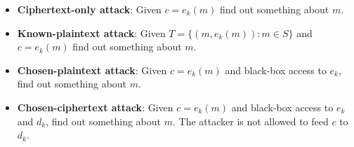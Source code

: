 \begin{itemize}
\item \textbf{Ciphertext-only attack}:
Given $c = e_k(m)$ find out something about $m$.

\item \textbf{Known-plaintext attack}:
Given $T = \{(m, e_k(m)): m \in S\}$ and $c = e_k(m)$ find out something about $m$.

\item \textbf{Chosen-plaintext attack}:
Given $c = e_k(m)$ and black-box access to $e_k$,
find out something about $m$.

\item \textbf{Chosen-ciphertext attack}:
Given $c = e_k(m)$ and black-box access to $e_k$ and $d_k$,
find out something about $m$. The attacker is not allowed to feed $c$ to $d_k$.
\end{itemize}


